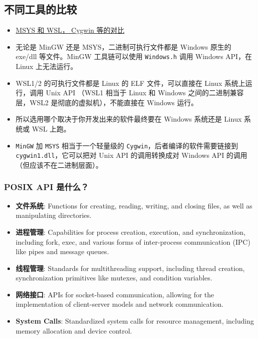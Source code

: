 
\subsection{不同工具的比较}
\begin{itemize}
\item \href{https://www.msys2.org/docs/what-is-msys2/}{MSYS 和 WSL， Cygwin 等的对比}
\item 无论是 MinGW 还是 MSYS，二进制可执行文件都是 Windows 原生的 exe/dll 等文件。MinGW 工具链可以使用 \verb`Windows.h` 调用 Windows API，在 Linux 上无法运行。
\item WSL1/2 的可执行文件都是 Linux 的 ELF 文件，可以直接在 Linux 系统上运行，调用 Unix API （WSL1 相当于 Linux 和 Windows 之间的二进制兼容层，WSL2 是彻底的虚拟机），不能直接在 Windows 运行。
\item 所以选用哪个取决于你开发出来的软件最终要在 Windows 系统还是 Linux 系统或 WSL 上跑。
\item \verb`MinGW` 加 \verb`MSYS` 相当于一个轻量级的 \verb`Cygwin`，后者编译的软件需要链接到 \verb`cygwin1.dll`，它可以把对 Unix API 的调用转换成对 Windows API 的调用（但应该不在二进制层面）。
\end{itemize}

\subsubsection{POSIX API 是什么？}
\begin{itemize}
\item \textbf{文件系统}: Functions for creating, reading, writing, and closing files, as well as manipulating directories.
\item \textbf{进程管理}: Capabilities for process creation, execution, and synchronization, including fork, exec, and various forms of inter-process communication (IPC) like pipes and message queues.
\item \textbf{线程管理}: Standards for multithreading support, including thread creation, synchronization primitives like mutexes, and condition variables.
\item \textbf{网络接口}: APIs for socket-based communication, allowing for the implementation of client-server models and network communication.
\item \textbf{System Calls}: Standardized system calls for resource management, including memory allocation and device control.
\end{itemize}


